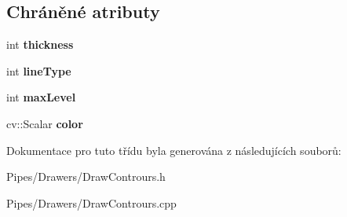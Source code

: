 \subsection*{Chráněné atributy}
\begin{DoxyCompactItemize}
\item 
\hypertarget{class_ar_pipe_1_1_draw_contours_a5d0e5819dcc6c7ba0ee109d40e526939}{int {\bfseries thickness}}\label{db/d85/class_ar_pipe_1_1_draw_contours_a5d0e5819dcc6c7ba0ee109d40e526939}

\item 
\hypertarget{class_ar_pipe_1_1_draw_contours_accb67a77f3281177187bb7f360c22e3d}{int {\bfseries line\-Type}}\label{db/d85/class_ar_pipe_1_1_draw_contours_accb67a77f3281177187bb7f360c22e3d}

\item 
\hypertarget{class_ar_pipe_1_1_draw_contours_a123fcf80721b18f66a15923d01458f04}{int {\bfseries max\-Level}}\label{db/d85/class_ar_pipe_1_1_draw_contours_a123fcf80721b18f66a15923d01458f04}

\item 
\hypertarget{class_ar_pipe_1_1_draw_contours_adeb714c56926f49e3de3e519c7b3e484}{cv\-::\-Scalar {\bfseries color}}\label{db/d85/class_ar_pipe_1_1_draw_contours_adeb714c56926f49e3de3e519c7b3e484}

\end{DoxyCompactItemize}


Dokumentace pro tuto třídu byla generována z následujících souborů\-:\begin{DoxyCompactItemize}
\item 
Pipes/\-Drawers/Draw\-Contrours.\-h\item 
Pipes/\-Drawers/Draw\-Contrours.\-cpp\end{DoxyCompactItemize}
